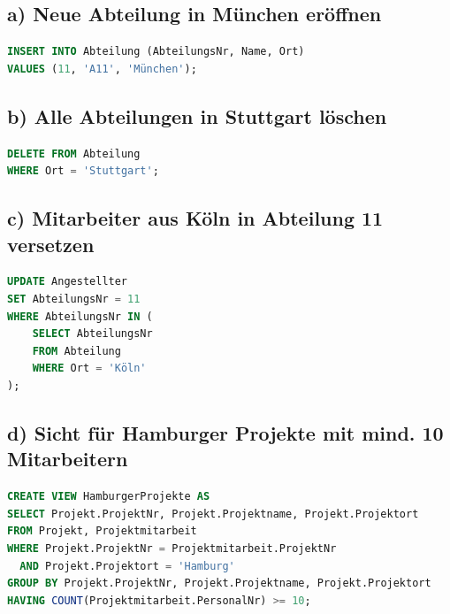 \documentclass[12pt]{scrartcl}
\begin{document}



    \newpage


    \subsection*{a) Neue Abteilung in München eröffnen}
    \begin{lstlisting}[language=SQL]
INSERT INTO Abteilung (AbteilungsNr, Name, Ort)
VALUES (11, 'A11', 'München');
    \end{lstlisting}

    \subsection*{b) Alle Abteilungen in Stuttgart löschen}
    \begin{lstlisting}[language=SQL]
DELETE FROM Abteilung
WHERE Ort = 'Stuttgart';
    \end{lstlisting}

    \subsection*{c) Mitarbeiter aus Köln in Abteilung 11 versetzen}
    \begin{lstlisting}[language=SQL]
UPDATE Angestellter
SET AbteilungsNr = 11
WHERE AbteilungsNr IN (
    SELECT AbteilungsNr
    FROM Abteilung
    WHERE Ort = 'Köln'
);
    \end{lstlisting}

    \subsection*{d) Sicht für Hamburger Projekte mit mind. 10 Mitarbeitern}
    \begin{lstlisting}[language=SQL]
CREATE VIEW HamburgerProjekte AS
SELECT Projekt.ProjektNr, Projekt.Projektname, Projekt.Projektort
FROM Projekt, Projektmitarbeit
WHERE Projekt.ProjektNr = Projektmitarbeit.ProjektNr
  AND Projekt.Projektort = 'Hamburg'
GROUP BY Projekt.ProjektNr, Projekt.Projektname, Projekt.Projektort
HAVING COUNT(Projektmitarbeit.PersonalNr) >= 10;
    \end{lstlisting}
\end{document}
